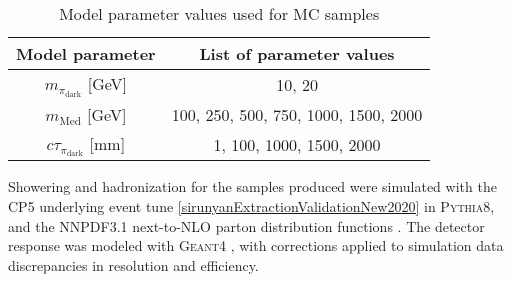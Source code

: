 \begin{table}[]
    \centering
    \begin{tabular}{|c|c|}
        \hline
        Model parameter & List of parameter values \\
        \hline
        $m_{\pi_{\text{dark}}}$ [GeV]   &   10, 20 \\
        $m_{\text{Med}}$ [GeV]          & 100, 250, 500, 750, 1000, 1500, 2000 \\
        $c\tau_{\pi_{\text{dark}}}$ [mm]& 1, 100, 1000, 1500, 2000\\
        \hline
    \end{tabular}
    \caption{Model parameter values used for MC samples}
    \label{tab:param_vals}
\end{table}

Showering and hadronization for the samples produced were simulated with the CP5 underlying event tune \ref{sirunyanExtractionValidationNew2020} in \textsc{Pythia8}, and the NNPDF3.1 next-to-NLO parton distribution functions \cite{ballPartonDistributionsHighprecision2017}. The detector response was modeled with \textsc{Geant4} \cite{agostinelliGeant4aSimulationToolkit2003}, with corrections applied to simulation data discrepancies in resolution and efficiency.